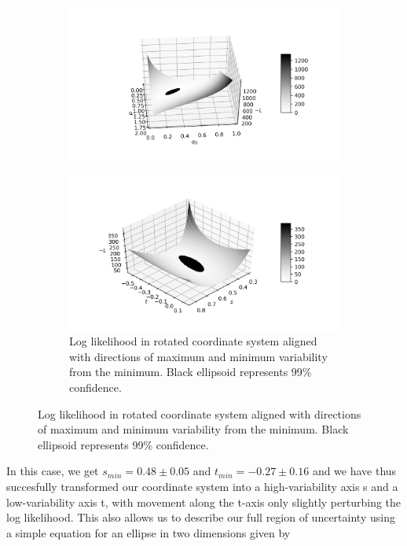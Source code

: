 \documentclass{article}
\begin{document}
\begin{figure}[h]
	\centering
	\begin{subfigure}[t]{0.45\linewidth}
		\centering
		\includegraphics[width = 1.0\linewidth, trim={90 40 60 60}, clip=true]{Lsurfthresh.png}
		\label{fig:Lsurfthresh}	
	\end{subfigure}%
	\hspace{0.05\linewidth}
	\begin{subfigure}[t]{0.45\linewidth}
		\centering
		\includegraphics[width = 1.0\linewidth, trim={90 40 60 60}, clip=true]{Lsurfrot.png}
		\caption{Log likelihood in rotated coordinate system aligned with directions of maximum and minimum variability from the minimum. Black ellipsoid represents 99\% confidence.}
		\label{fig:Lsurfrot}
	\end{subfigure}
\end{figure}

In this case, we get $s_{min} = 0.48 \pm 0.05 $ and $t_{min} = -0.27 \pm 0.16 $ and we have thus succesfully transformed our coordinate system into a high-variability axis s and a low-variability axis t, with movement along the t-axis only slightly perturbing the log likelihood. This also allows us to describe our full region of uncertainty using a simple equation for an ellipse in two dimensions given by
\end{document}
